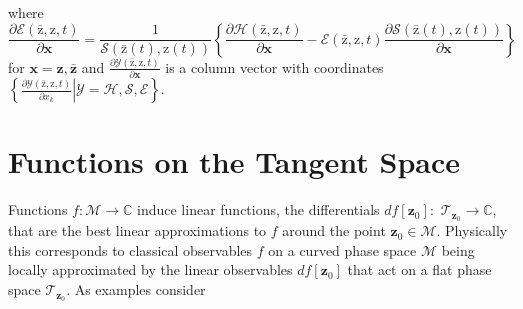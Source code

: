 \documentclass[aps,preprint]{revtex4}%
\begin{document}
where
\begin{equation}
\frac{\partial\mathcal{E}\left(  \mathrm{\bar{z}}\mathbf{,}\mathrm{z}%
,t\right)  }{\partial\mathbf{x}}=\frac{1}{\mathcal{S}\left(  \mathrm{\bar{z}%
}\left(  t\right)  ,\mathrm{z}\left(  t\right)  \right)  }\left\{
\frac{\partial\mathcal{H}\left(  \mathrm{\bar{z}}\mathbf{,}\mathrm{z}%
,t\right)  }{\partial\mathbf{x}}-\mathcal{E}\left(  \mathrm{\bar{z}}%
\mathbf{,}\mathrm{z},t\right)  \frac{\partial\mathcal{S}\left(  \mathrm{\bar
{z}}\left(  t\right)  ,\mathrm{z}\left(  t\right)  \right)  }{\partial
\mathbf{x}}\right\}
\end{equation}
for $\mathbf{x=z,\bar{z}}$ and $\frac{\partial\mathcal{Y}\left(
\mathrm{\bar{z}}\mathbf{,}\mathrm{z},t\right)  }{\partial\mathbf{x}}$ is a
column vector with coordinates $\left\{  \left.  \frac{\partial\mathcal{Y}%
\left(  \mathrm{\bar{z}}\mathbf{,}\mathrm{z},t\right)  }{\partial x_{k}%
}\right\vert \mathcal{Y=H},\mathcal{S},\mathcal{E}\right\}  $.

\section{Functions on the Tangent Space\label{functions}}

Functions $f:\mathcal{M}\rightarrow\mathbb{C}$ induce linear functions, the
differentials $df\left[  \mathbf{z}_{0}\right]  :$ $\mathcal{T}_{\mathbf{z}%
_{0}}\rightarrow\mathbb{C}$, that are the best linear approximations to $f$
around the point $\mathbf{z}_{0}\in\mathcal{M}$. Physically this corresponds
to classical observables $f$ on a curved phase space $\mathcal{M}$ being
locally approximated by the linear observables $df\left[  \mathbf{z}%
_{0}\right]  $ that act on a flat phase space $\mathcal{T}_{\mathbf{z}_{0}}$.
As examples consider
\end{document}
